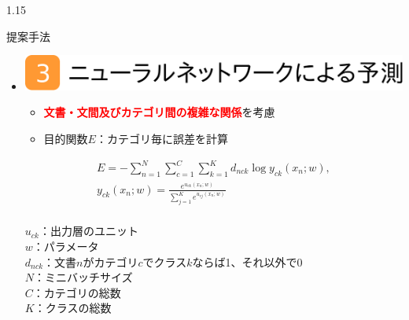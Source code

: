 \documentclass[unicode,10pt]{beamer}
\newlength{\mycolumnwidth}
\newlength{\mytitlefigureheight}
\newcommand{\itemtitle}[1]{\textbf{#1}\\}
\newcommand{\fire}[1]{\textcolor{red}{\textbf{#1}}}
\newcommand{\doublecolumns}[4]{
    \begin{minipage}[t]{#1}
      #2
    \end{minipage}
    \begin{minipage}[t]{#3}
      #4
    \end{minipage}}
\begin{document}
\begin{frame}[t]
\begin{columns}[onlytextwidth,t]
\begin{column}{1.15\mycolumnwidth}
\begin{block}{提案手法}
\begin{itemize}
      \item \itemtitle{\includegraphics[height=\mytitlefigureheight]
                                       {fig/poster_model_title_3.pdf}}
          \begin{itemize}
            \item \fire{文書・文間及びカテゴリ間の複雑な関係}を考慮
            \item 目的関数$E$：カテゴリ毎に誤差を計算
          \end{itemize}
        \doublecolumns{0.6\linewidth}{
          \vspace{-1.5em} %
          \begin{gather*}
            E = - \sum^{N}_{n = 1} \sum^{C}_{c = 1} \sum^{K}_{k = 1}
                  d_{nck} \log{y_{ck}(x_n; w)},
            \label{eq:NNObjective} \\
            y_{ck}(x_n; w) = \frac{e^{u_{ck}(x_n; w)}}
                                  {\sum^{K}_{j = 1} e^{u_{cj}(x_n; w)}}%
            \nonumber \\
          \end{gather*}
        }{0.375\linewidth}{
          \small
          $u_{ck}$：出力層のユニット \\
          $w$：パラメータ \\
          $d_{nck}$：文書$n$がカテゴリ$c$でクラス$k$ならば1、それ以外で0 \\
          $N$：ミニバッチサイズ \\
          $C$：カテゴリの総数 \\
          $K$：クラスの総数 \\
        }
    \end{itemize}
  \end{block}
\end{column}


\end{columns}
\end{frame}
\end{document}
